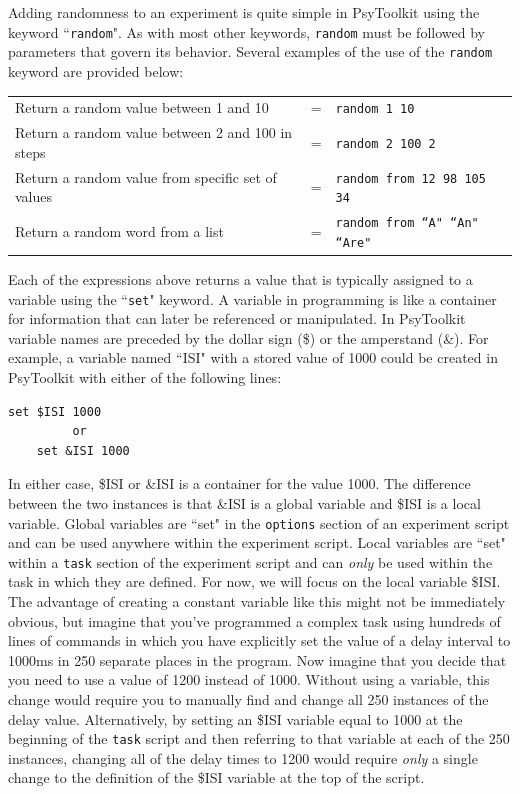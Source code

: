Adding randomness to an experiment is quite simple in PsyToolkit using the keyword ``\texttt{random}".  As with most other keywords, \texttt{random} must be followed by parameters that govern its behavior. Several examples of the use of the \texttt{random} keyword are provided below:
\begin{center}
\begin{tabular}{ l l l}
    Return a random value between 1 and 10 &= & \texttt{random 1 10}\\
    Return a random value between 2 and 100 in steps &= & \texttt{random 2 100 2}\\
    Return a random value from specific set of values &= & \texttt{random from 12 98 105 34}\\
    Return a random word from a list &= & \texttt{random from ``A" ``An" ``Are"}\\
\end{tabular}
\end{center}

Each of the expressions above returns a value that is typically assigned to a variable using the ``\texttt{set}" keyword.  A \gls{variable} in programming is like a container for information that can later be referenced or manipulated.  In PsyToolkit variable names are preceded by the dollar sign (\$) or the amperstand (\&). For example, a variable named ``ISI" with a stored value of 1000 could be created in PsyToolkit with either of the following lines:
\begin{Verbatim}[xleftmargin=2.5in]
    set $ISI 1000
         or
    set &ISI 1000
\end{Verbatim}

In either case, \$ISI or \&ISI is a container for the value 1000.  The difference between the two instances is that \&ISI is a \gls{global variable} and \$ISI is a \gls{local variable}.  Global variables are ``set" in the \texttt{options} section of an experiment script and can be used anywhere within the experiment script.  Local variables are ``set" within a \texttt{task} section of the experiment script and can \emph{only} be used within the task in which they are defined. For now, we will focus on the local variable \$ISI. The advantage of creating a constant variable like this might not be immediately obvious, but imagine that you've programmed a complex task using hundreds of lines of commands in which you have explicitly set the value of a delay interval to 1000ms in 250 separate places in the program.  Now imagine that you decide that you need to use a value of 1200 instead of 1000.  Without using a variable, this change would require you to manually find and change all 250 instances of the delay value.  Alternatively, by setting an \$ISI variable equal to 1000 at the beginning of the \texttt{task} script and then referring to that variable at each of the 250 instances, changing all of the delay times to 1200 would require \emph{only} a single change to the definition of the \$ISI variable at the top of the script.

